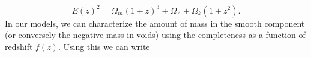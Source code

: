 \begin{equation}
E(z)^2 = \Omega_m (1 + z)^3 + \Omega_\Lambda + \Omega_k (1 + z^2).
\end{equation}
In our models, we can characterize the amount of mass in the smooth component (or conversely the negative mass in voids)
using the completeness as a function of redshift $f(z)$. Using this we can write
  